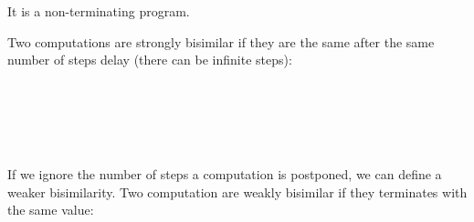 It is a non-terminating program.

Two computations are strongly bisimilar if they are the
same after the same number of steps delay (there can be infinite
steps):

\begin{code}
\\
\>  \AgdaSymbol{\{} \AgdaSymbol{:} \AgdaSymbol{\}} \AgdaSymbol{:}        \<%
\\
\>[2]\<[4]%
\>[4] \<[11]%
\>[11]\AgdaSymbol{:}  \AgdaSymbol{\{}\AgdaSymbol{\}}  \AgdaSymbol{(} \AgdaSymbol{)}  \AgdaSymbol{(} \AgdaSymbol{)}\<%
\\
\>[2]\<[4]%
\>[4] \<[11]%
\>[11]\AgdaSymbol{:}  \AgdaSymbol{\{} \AgdaSymbol{\}} \AgdaSymbol{(} \AgdaSymbol{:}  \AgdaSymbol{((} \AgdaSymbol{)}  \AgdaSymbol{(} \AgdaSymbol{)))}  \AgdaSymbol{(} \AgdaSymbol{)}  \AgdaSymbol{(} \AgdaSymbol{)}\<%
\\
\end{code}

If we ignore the number of steps a computation is postponed, we can define a weaker bisimilarity. 
Two computation are weakly bisimilar if they terminates with the
same value:

